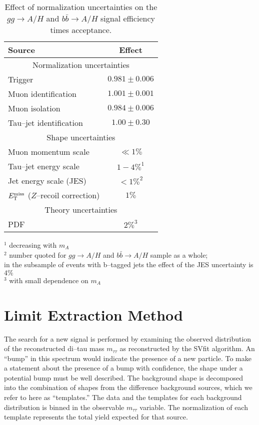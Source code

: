 \begin{table}[t]
\begin{center}
\tablesize
\begin{tabular}{|l|c|}
\hline
Source & Effect \\
\hline
\hline
\multicolumn{2}{|c|}{Normalization uncertainties} \\
\hline
Trigger                         & $0.981 \pm 0.006$ \\
Muon identification             & $1.001 \pm 0.001$ \\
Muon isolation                  & $0.984 \pm 0.006$ \\
Tau--jet identification         & $1.00  \pm 0.30$ \\
\hline
\hline
\multicolumn{2}{|c|}{Shape uncertainties} \\
\hline
Muon momentum scale             & $\ll 1\%$ \\
Tau--jet energy scale           & $1 - 4\%^{1}$ \\
Jet energy scale (JES)          & $< 1\%^{2}$ \\
$E_{\mathrm{T}}^{\text{miss}}$ ($Z$--recoil correction) & $1\%$ \\
\hline
\hline
\multicolumn{2}{|c|}{Theory uncertainties} \\
\hline
PDF & $2\%^{3}$ \\
\hline
\end{tabular}
\end{center}
$^{1}$ decreasing with $m_{A}$ \\
$^{2}$ number quoted for $gg \to A/H$ and $b\bar{b} \to A/H$ sample as a whole; \\
\hspace{5mm} in the subsample of events with b--tagged jets the effect of the JES uncertainty is $4\%$ \\
$^{3}$ with small dependence on $m_{A}$ \\
\begin{center}
\caption[Effect of normalization uncertainties on signal efficiency times
acceptance]{\captiontext Effect of normalization uncertainties on the $gg \to
A/H$ and $b\bar{b} \to A/H$ signal efficiency times acceptance.}
\label{tab:ExpUncertainties}
\end{center}
\end{table}
%
\section{Limit Extraction Method}
\label{sec:statmethod}
%
The search for a new signal is performed by examining the observed distribution
of the reconstructed di--tau mass $m_{\tau\tau}$ as reconstructed by the SVfit
algorithm.  An ``bump'' in this spectrum would indicate the presence of a new
particle.  To make a statement about the presence of a bump with confidence, the
shape under a potential bump must be well described.  The background shape is
decomposed into the combination of shapes from the difference background
sources, which we refer to here as ``templates.'' The data and the templates for
each background distribution is binned in the observable $m_{\tau\tau}$
variable.  The normalization of each template represents the total yield
expected for that source.

